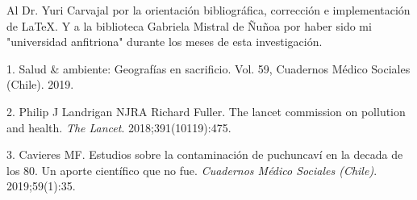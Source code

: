 \documentclass[]{article}
\begin{document}
Al Dr. Yuri Carvajal por la orientación bibliográfica, corrección e implementación de LaTeX. Y a la biblioteca Gabriela Mistral de Ñuñoa por haber sido mi "universidad anfitriona" durante los meses de esta investigación.


\hypertarget{refs}{}
\leavevmode\hypertarget{ref-cms59}{}%
1. Salud \& ambiente: Geografías en sacrificio. Vol. 59, Cuadernos
Médico Sociales (Chile). 2019.

\leavevmode\hypertarget{ref-landrigan2017}{}%
2. Philip J Landrigan NJRA Richard Fuller. The lancet commission on
pollution and health. \emph{The Lancet}. 2018;391(10119):475.

\leavevmode\hypertarget{ref-cms80s}{}%
3. Cavieres MF. Estudios sobre la contaminación de puchuncaví en la
decada de los 80. Un aporte científico que no fue. \emph{Cuadernos
Médico Sociales (Chile)}. 2019;59(1):35.
\end{document}

